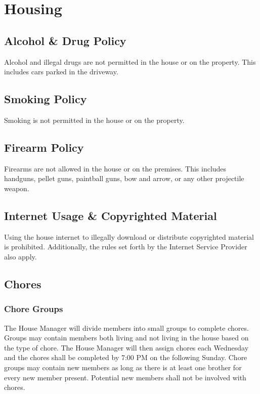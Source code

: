 \chapter{Housing}
\label{cha:housing}

\section{Alcohol \& Drug Policy}

Alcohol and illegal drugs are not permitted in the house or on the property.
This includes cars parked in the driveway. 

\section{Smoking Policy}

Smoking is not permitted in the house or on the property.

\section{Firearm Policy}

Firearms are not allowed in the house or on the premises.
This includes handguns, pellet guns, paintball guns, bow and arrow, or any
other projectile weapon.

\section{Internet Usage \& Copyrighted Material}

Using the house internet to illegally download or distribute copyrighted
material is prohibited.
Additionally, the rules set forth by the Internet Service Provider also apply.

\section{Chores}

\subsection{Chore Groups}

The House Manager will divide members into small groups to complete chores.
Groups may contain members both living and not living in the house based on the
type of chore.
The House Manager will then assign chores each Wednesday and the chores shall
be completed by 7:00 PM on the following Sunday.
Chore groups may contain new members as long as there is at least one brother
for every new member present.
Potential new members shall not be involved with chores.

